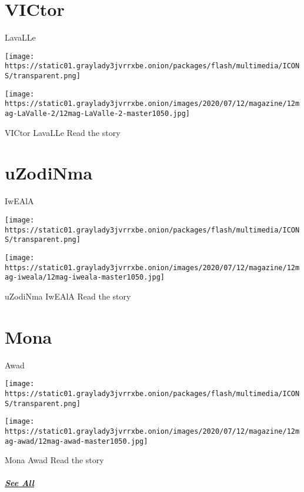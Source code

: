 \href{https://www.nytimes3xbfgragh.onion/interactive/2020/07/07/magazine/victor-lavalle-short-story.html}{}

\hypertarget{victor}{%
\section{VICtor}\label{victor}}

LavaLLe

\texttt{[image: https://static01.graylady3jvrrxbe.onion/packages/flash/multimedia/ICONS/transparent.png]}

\texttt{[image: https://static01.graylady3jvrrxbe.onion/images/2020/07/12/magazine/12mag-LaValle-2/12mag-LaValle-2-master1050.jpg]}

VICtor LavaLLe Read the story

\href{https://www.nytimes3xbfgragh.onion/interactive/2020/07/07/magazine/iweala-sleep-short-story.html}{}

\hypertarget{uzodinma}{%
\section{uZodiNma}\label{uzodinma}}

IwEAlA

\texttt{[image: https://static01.graylady3jvrrxbe.onion/packages/flash/multimedia/ICONS/transparent.png]}

\texttt{[image: https://static01.graylady3jvrrxbe.onion/images/2020/07/12/magazine/12mag-iweala/12mag-iweala-master1050.jpg]}

uZodiNma IwEAlA Read the story

\href{https://www.nytimes3xbfgragh.onion/interactive/2020/07/07/magazine/awad-blue-short-story.html}{}

\hypertarget{mona}{%
\section{Mona}\label{mona}}

Awad

\texttt{[image: https://static01.graylady3jvrrxbe.onion/packages/flash/multimedia/ICONS/transparent.png]}

\texttt{[image: https://static01.graylady3jvrrxbe.onion/images/2020/07/12/magazine/12mag-awad/12mag-awad-master1050.jpg]}

Mona Awad Read the story

\hypertarget{see-all}{%
\subparagraph{\texorpdfstring{\href{https://www.nytimes3xbfgragh.onion/interactive/2020/07/07/magazine/decameron-project-short-story-collection.html}{See
All}}{See All}}\label{see-all}}

